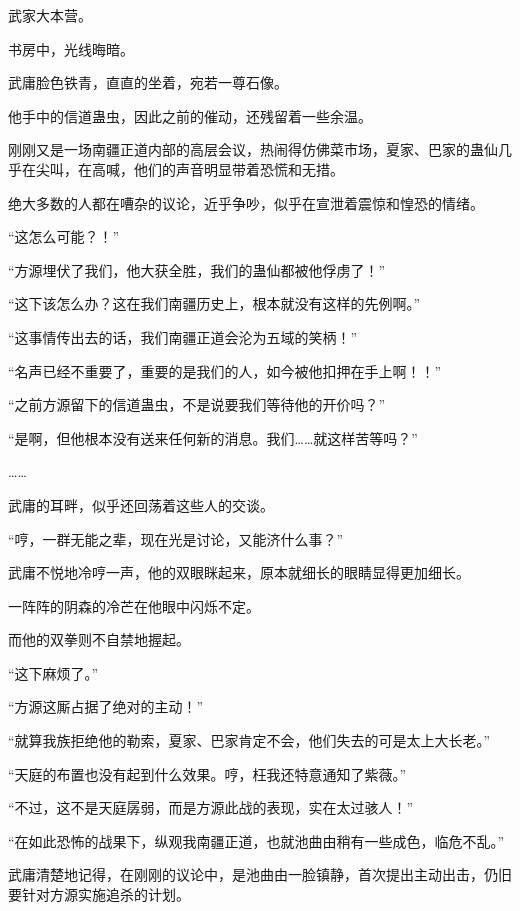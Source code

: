 
\begin{this_body}

武家大本营。

书房中，光线晦暗。

武庸脸色铁青，直直的坐着，宛若一尊石像。

他手中的信道蛊虫，因此之前的催动，还残留着一些余温。

刚刚又是一场南疆正道内部的高层会议，热闹得仿佛菜市场，夏家、巴家的蛊仙几乎在尖叫，在高喊，他们的声音明显带着恐慌和无措。

绝大多数的人都在嘈杂的议论，近乎争吵，似乎在宣泄着震惊和惶恐的情绪。

“这怎么可能？！”

“方源埋伏了我们，他大获全胜，我们的蛊仙都被他俘虏了！”

“这下该怎么办？这在我们南疆历史上，根本就没有这样的先例啊。”

“这事情传出去的话，我们南疆正道会沦为五域的笑柄！”

“名声已经不重要了，重要的是我们的人，如今被他扣押在手上啊！！”

“之前方源留下的信道蛊虫，不是说要我们等待他的开价吗？”

“是啊，但他根本没有送来任何新的消息。我们……就这样苦等吗？”

……

武庸的耳畔，似乎还回荡着这些人的交谈。

“哼，一群无能之辈，现在光是讨论，又能济什么事？”

武庸不悦地冷哼一声，他的双眼眯起来，原本就细长的眼睛显得更加细长。

一阵阵的阴森的冷芒在他眼中闪烁不定。

而他的双拳则不自禁地握起。

“这下麻烦了。”

“方源这厮占据了绝对的主动！”

“就算我族拒绝他的勒索，夏家、巴家肯定不会，他们失去的可是太上大长老。”

“天庭的布置也没有起到什么效果。哼，枉我还特意通知了紫薇。”

“不过，这不是天庭孱弱，而是方源此战的表现，实在太过骇人！”

“在如此恐怖的战果下，纵观我南疆正道，也就池曲由稍有一些成色，临危不乱。”

武庸清楚地记得，在刚刚的议论中，是池曲由一脸镇静，首次提出主动出击，仍旧要针对方源实施追杀的计划。


\end{this_body}
